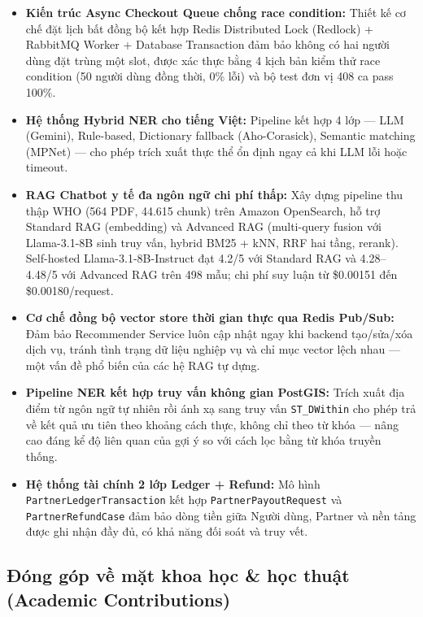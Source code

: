 \begin{itemize}
    \item \textbf{Kiến trúc Async Checkout Queue chống race condition:} Thiết kế cơ chế đặt lịch bất đồng bộ kết hợp Redis Distributed Lock (Redlock) + RabbitMQ Worker + Database Transaction đảm bảo không có hai người dùng đặt trùng một slot, được xác thực bằng 4 kịch bản kiểm thử race condition (50 người dùng đồng thời, 0\% lỗi) và bộ test đơn vị 408 ca pass 100\%.
    \item \textbf{Hệ thống Hybrid NER cho tiếng Việt:} Pipeline kết hợp 4 lớp --- LLM (Gemini), Rule-based, Dictionary fallback (Aho-Corasick), Semantic matching (MPNet) --- cho phép trích xuất thực thể ổn định ngay cả khi LLM lỗi hoặc timeout.
    \item \textbf{RAG Chatbot y tế đa ngôn ngữ chi phí thấp:} Xây dựng pipeline thu thập WHO (564 PDF, 44.615 chunk) trên Amazon OpenSearch, hỗ trợ Standard RAG (embedding) và Advanced RAG (multi-query fusion với Llama-3.1-8B sinh truy vấn, hybrid BM25 + kNN, RRF hai tầng, rerank). Self-hosted Llama-3.1-8B-Instruct đạt 4.2/5 với Standard RAG và 4.28--4.48/5 với Advanced RAG trên 498 mẫu; chi phí suy luận từ \$0.00151 đến \$0.00180/request.
    \item \textbf{Cơ chế đồng bộ vector store thời gian thực qua Redis Pub/Sub:} Đảm bảo Recommender Service luôn cập nhật ngay khi backend tạo/sửa/xóa dịch vụ, tránh tình trạng dữ liệu nghiệp vụ và chỉ mục vector lệch nhau --- một vấn đề phổ biến của các hệ RAG tự dựng.
    \item \textbf{Pipeline NER kết hợp truy vấn không gian PostGIS:} Trích xuất địa điểm từ ngôn ngữ tự nhiên rồi ánh xạ sang truy vấn \texttt{ST\_DWithin} cho phép trả về kết quả ưu tiên theo khoảng cách thực, không chỉ theo từ khóa --- nâng cao đáng kể độ liên quan của gợi ý so với cách lọc bằng từ khóa truyền thống.
    \item \textbf{Hệ thống tài chính 2 lớp Ledger + Refund:} Mô hình \texttt{PartnerLedgerTransaction} kết hợp \texttt{PartnerPayoutRequest} và \texttt{PartnerRefundCase} đảm bảo dòng tiền giữa Người dùng, Partner và nền tảng được ghi nhận đầy đủ, có khả năng đối soát và truy vết.
\end{itemize}

\subsection{Đóng góp về mặt khoa học \& học thuật (Academic Contributions)}

